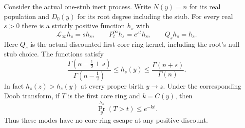 \begin{theorem}
\label{pm:all-discounts}
Consider the actual one-stub inert process.  Write $N(y)=n$ for its
real population and $D_0(y)$ for its root degree including the stub.
For every real $s>0$ there is a strictly positive function $h_s$ with
\[
 \mathcal L_\infty h_s=s h_s,
 \qquad P_t^\infty h_s=e^{st}h_s,
 \qquad Q_s h_s=h_s.
\]
Here $Q_s$ is the actual discounted first-core-ring kernel, including
the root's null stub choice.  The functions satisfy
\begin{equation}\label{pm:gamma-bounds}
 \frac{\Gamma(n-\tfrac12+s)}{\Gamma(n-\tfrac12)}
 \le h_s(y)\le
 \frac{\Gamma(n+s)}{\Gamma(n)}.
\end{equation}
In fact $h_s(z)>h_s(y)$ at every proper birth $y\to z$.  Under the
corresponding Doob transform, if $T$ is the first core ring and
$k=C(y)$, then
\[
 \Pr_y^{h_s}(T>t)\le e^{-kt}.
\]
Thus these modes have no core-ring escape at any positive discount.
\end{theorem}

